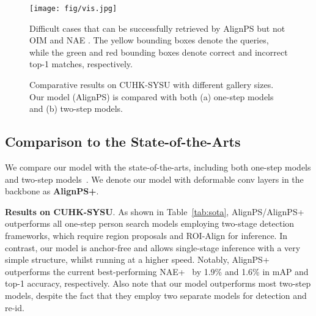 \documentclass[final]{cvpr}
\begin{document}
\begin{figure*}[ht]
\setlength{\abovecaptionskip}{1mm}
\begin{center}
\texttt{[image: fig/vis.jpg]}
\end{center}
\vspace{-4mm}
   \caption{Difficult cases that can be successfully retrieved by AlignPS but not OIM \cite{DBLP:conf/cvpr/XiaoLWLW17} and NAE  \cite{DBLP:conf/cvpr/ChenZYS20}.  The yellow bounding boxes denote the queries, while the green and red bounding boxes denote correct and incorrect top-1 matches, respectively.}
\label{fig:vis}
\vspace{-4mm}
\end{figure*}


\begin{figure}[t]
\vspace{-4mm}
\setlength{\abovecaptionskip}{1mm}
\centering
{}
 \hfill
{}
 \caption{Comparative results on CUHK-SYSU with different gallery sizes. Our model (AlignPS) is compared with both (a) one-step models and (b) two-step models.}
 \label{fig:gallerysize}
\vspace{-2mm}
\end{figure}

\subsection{Comparison to the State-of-the-Arts}
We compare our model with the state-of-the-arts, including both one-step models \cite{DBLP:conf/cvpr/XiaoLWLW17,DBLP:journals/pr/XiaoXTHWF19,DBLP:conf/iccv/LiuFJKZQJY17,DBLP:conf/eccv/ChangHSLYH18,DBLP:conf/cvpr/YanZNZXY19,DBLP:conf/cvpr/MunjalATG19,DBLP:conf/cvpr/DongZST20a,DBLP:conf/cvpr/ChenZYS20} and two-step models~\cite{DBLP:conf/eccv/ChenZOYT18,DBLP:conf/eccv/LanZG18,DBLP:conf/iccv/HanYZTZGS19,DBLP:conf/cvpr/DongZST20,DBLP:conf/cvpr/WangMCSC20}. We denote our model with deformable conv layers in the backbone as \textbf{AlignPS+}.


\textbf{Results on CUHK-SYSU}.
As shown in Table~\ref{tab:sota}, AlignPS/AlignPS+ outperforms all one-step person search models employing two-stage detection frameworks, which require region proposals and ROI-Align for inference. In contrast, our model is anchor-free and allows single-stage inference with a very simple structure, whilst running at a higher speed. Notably, AlignPS+ outperforms the current best-performing NAE+~\cite{DBLP:conf/cvpr/ChenZYS20} by 1.9\% and 1.6\% in mAP and top-1 accuracy, respectively. Also note that our model outperforms most two-step models, despite the fact that they employ two separate models for detection and re-id.
\end{document}
